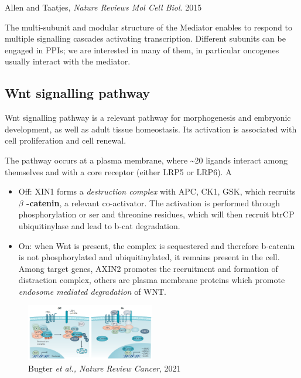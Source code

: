 Allen and Taatjes, \emph{Nature Reviews Mol Cell Biol}. 2015

The multi-subunit and modular structure of the Mediator enables to respond to multiple signalling cascades activating transcription. Different subunits can be engaged in PPIs; we are interested in many of them, in particular oncogenes usually interact with the mediator.

\hypertarget{wnt-signalling-pathway}{%
\subsection{Wnt signalling pathway}\label{wnt-signalling-pathway}}

Wnt signalling pathway is a relevant pathway for morphogenesis and embryonic development, as well as adult tissue homeostasis. Its activation is associated with cell proliferation and cell renewal.

The pathway occurs at a plasma membrane, where \textasciitilde20 ligands interact among themselves and with a core receptor (either LRP5 or LRP6). A

\begin{itemize}
\tightlist
\item
  Off: XIN1 forms a \emph{destruction complex} with APC, CK1, GSK, which recruits \textbf{$\beta$  -catenin}, a relevant co-activator. The activation is performed through phosphorylation or ser and threonine residues, which will then recruit btrCP ubiquitinylase and lead to b-cat degradation.
\item
  On: when Wnt is present, the complex is sequestered and therefore b-catenin is not phosphorylated and ubiquitinylated, it remains present in the cell. Among target genes, AXIN2 promotes the recruitment and formation of distraction complex, others are plasma membrane proteins which promote \emph{endosome mediated degradation} of WNT.
\end{itemize}

\begin{figure}
\centering
\includegraphics[width=0.5\textwidth]{../_resources/Screenshot_2022-10-10_at_11-03-55.png}
\caption{Bugter \emph{et al., Nature Review Cancer}, 2021}
\end{figure}

